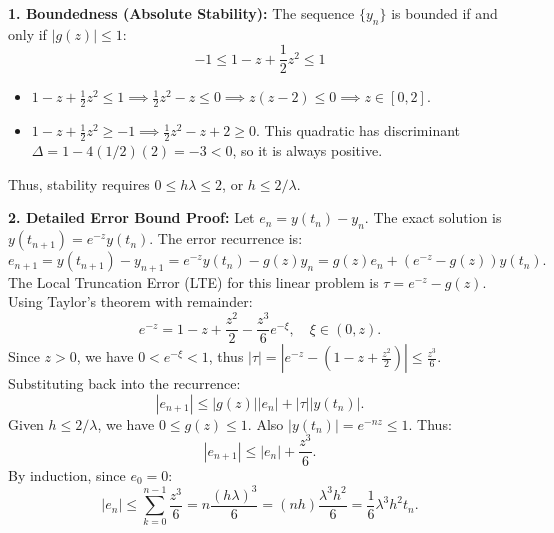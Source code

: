 \begin{solution}
\textbf{1. Boundedness (Absolute Stability):}
The sequence $\{y_n\}$ is bounded if and only if $|g(z)| \leq 1$:
\[ -1 \leq 1 - z + \frac{1}{2} z^2 \leq 1 \]
\begin{itemize}
    \item $1 - z + \frac{1}{2} z^2 \leq 1 \implies \frac{1}{2} z^2 - z \leq 0 \implies z(z-2) \leq 0 \implies z \in [0, 2]$.
    \item $1 - z + \frac{1}{2} z^2 \geq -1 \implies \frac{1}{2} z^2 - z + 2 \geq 0$. This quadratic has discriminant $\Delta = 1 - 4(1/2)(2) = -3 < 0$, so it is always positive.
\end{itemize}
Thus, stability requires $0 \leq h\lambda \leq 2$, or $\boxed{h \leq 2/\lambda}$. 

\textbf{2. Detailed Error Bound Proof:}
Let $e_n = y(t_n) - y_n$. The exact solution is $y(t_{n+1}) = e^{-z} y(t_n)$. The error recurrence is:
\[ e_{n+1} = y(t_{n+1}) - y_{n+1} = e^{-z} y(t_n) - g(z) y_n = g(z) e_n + (e^{-z} - g(z)) y(t_n). \]
The Local Truncation Error (LTE) for this linear problem is $\tau = e^{-z} - g(z)$. Using Taylor's theorem with remainder:
\[ e^{-z} = 1 - z + \frac{z^2}{2} - \frac{z^3}{6} e^{-\xi}, \quad \xi \in (0, z). \]
Since $z > 0$, we have $0 < e^{-\xi} < 1$, thus $|\tau| = |e^{-z} - (1 - z + \frac{z^2}{2})| \leq \frac{z^3}{6}$.
Substituting back into the recurrence:
\[ |e_{n+1}| \leq |g(z)| |e_n| + |\tau| |y(t_n)|. \]
Given $h \leq 2/\lambda$, we have $0 \leq g(z) \leq 1$. Also $|y(t_n)| = e^{-n z} \leq 1$. Thus:
\[ |e_{n+1}| \leq |e_n| + \frac{z^3}{6}. \]
By induction, since $e_0 = 0$:
\[ |e_n| \leq \sum_{k=0}^{n-1} \frac{z^3}{6} = n \frac{(h\lambda)^3}{6} = (nh) \frac{\lambda^3 h^2}{6} = \frac{1}{6} \lambda^3 h^2 t_n. \]
\end{solution}


